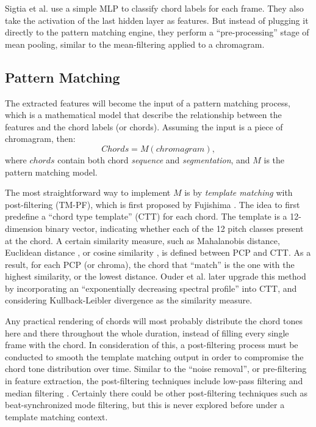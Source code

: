 Sigtia et al. \cite{sigtia2015audio} use a simple MLP to classify chord labels for each frame. They also take the activation of the last hidden layer as features. But instead of plugging it directly to the pattern matching engine, they perform a ``pre-processing'' stage of mean pooling, similar to the mean-filtering applied to a chromagram.


\subsection{Pattern Matching} \label{sec:2-pm}
The extracted features will become the input of a pattern matching process, which is a mathematical model that describe the relationship between the features and the chord labels (or chords). Assuming the input is a piece of chromagram, then:
\begin{equation}
\mathit{Chords = M(chromagram)},
\end{equation}
where $chords$ contain both chord {\it sequence} and {\it segmentation}, and $M$ is the pattern matching model.

The most straightforward way to implement $M$ is by {\it template matching} with post-filtering (TM-PF), which is first proposed by Fujishima \cite{fujishima1999realtime}. The idea to first predefine a ``chord type template'' (CTT) for each chord. The template is a 12-dimension binary vector, indicating whether each of the 12 pitch classes present at the chord. A certain similarity measure, such as Mahalanobis distance\cite{reinhard2008enhancing}, Euclidean distance \cite{zenz2007automatic}, or cosine similarity \cite{harte2005automatic}, is defined between PCP and CTT. As a result, for each PCP (or chroma), the chord that ``match'' is the one with the highest similarity, or the lowest distance. Ouder et al. \cite{oudre2009template} later upgrade this method by incorporating an ``exponentially decreasing spectral profile'' \cite{gomez2006tonal_a} into CTT, and considering Kullback-Leibler divergence \cite{kullback1951information} as the similarity measure.

Any practical rendering of chords will most probably distribute the chord tones here and there throughout the whole duration, instead of filling every single frame with the chord. In consideration of this, a post-filtering process must be conducted to smooth the template matching output in order to compromise the chord tone distribution over time. Similar to the ``noise removal'', or pre-filtering \cite{cho2014improved} in feature extraction, the post-filtering \cite{cho2014improved} techniques include low-pass filtering \cite{oudre2009template} and median filtering \cite{harte2005automatic,humphrey2012rethinking}. Certainly there could be other post-filtering techniques such as beat-synchronized mode filtering, but this is never explored before under a template matching context.

